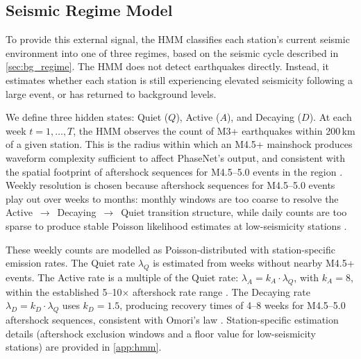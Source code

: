 \subsection{Seismic Regime Model}
\label{sec:regime_model}

To provide this external signal, the HMM classifies each station's current seismic environment into one of three regimes, based on the seismic cycle described in \cref{sec:bg_regime}. The HMM does not detect earthquakes directly. Instead, it estimates whether each station is still experiencing elevated seismicity following a large event, or has returned to background levels.

\medskip
We define three hidden states: Quiet ($Q$), Active ($A$), and Decaying ($D$). At each week $t = 1, \ldots, T$, the HMM observes the count of M3+ earthquakes within 200\,km of a given station. This is the radius within which an M4.5+ mainshock produces waveform complexity sufficient to affect PhaseNet's output, and consistent with the spatial footprint of aftershock sequences for M4.5--5.0 events in the region \citep{reasenberg1989earthquake}. Weekly resolution is chosen because aftershock sequences for M4.5--5.0 events play out over weeks to months: monthly windows are too coarse to resolve the Active~$\to$~Decaying~$\to$~Quiet transition structure, while daily counts are too sparse to produce stable Poisson likelihood estimates at low-seismicity stations \cite{utsu1995centenary}.

\medskip
These weekly counts are modelled as Poisson-distributed with station-specific emission rates. The Quiet rate $\lambda_Q$ is estimated from weeks without nearby M4.5+ events. The Active rate is a multiple of the Quiet rate: $\lambda_A = k_A \cdot \lambda_Q$, with $k_A = 8$, within the established 5--10$\times$ aftershock rate range \citep{reasenberg1989earthquake}. The Decaying rate $\lambda_D = k_D \cdot \lambda_Q$ uses $k_D = 1.5$, producing recovery times of 4--8 weeks for M4.5--5.0 aftershock sequences, consistent with Omori's law \citep{utsu1995centenary}. Station-specific estimation details (aftershock exclusion windows and a floor value for low-seismicity stations) are provided in \cref{app:hmm}.


